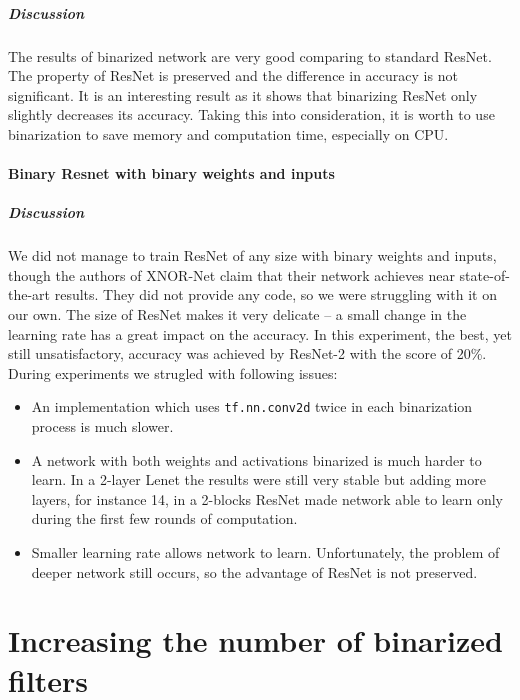 \documentclass[licencjacka]{pracamgr}
\begin{document}
		        \paragraph{Discussion} 

		        The results of binarized network are very good comparing to standard ResNet. The property of ResNet is preserved and the difference in accuracy is not significant. It is an interesting result as it shows that binarizing ResNet only slightly decreases its accuracy. Taking this into consideration, it is worth to use binarization to save memory and computation time, especially on CPU.

			\subsubsection{Binary Resnet with binary weights and inputs}
			        \paragraph{Discussion} 
				We did not manage to train ResNet of any size with binary weights and inputs, though the authors of XNOR-Net claim that their network achieves near state-of-the-art results. They did not provide any code, so we were struggling with it on our own. The size of ResNet makes it very delicate -- a small change in the learning rate has a great impact on the accuracy. In this experiment, the best, yet still unsatisfactory, accuracy was achieved by ResNet-2 with the score of 20\%. 
				During experiments we strugled with following issues:
			        \begin{itemize}
			                \item An implementation which uses \texttt{tf.nn.conv2d} twice in each binarization process is much slower. 
			                \item A network with both weights and activations binarized is much harder to learn. In a 2-layer Lenet the results were still very stable but adding more layers, for instance 14, in a 2-blocks ResNet made network able to learn only during the first few rounds of computation.
			                \item Smaller learning rate allows network to learn. Unfortunately, the problem of deeper network still occurs, so the advantage of ResNet is not preserved.
			        \end{itemize}
\chapter{Increasing the number of binarized filters}
\end{document}
